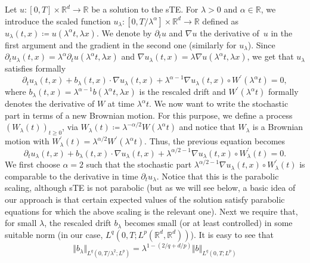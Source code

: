 \documentclass[a4paper,10pt]{article}
\newcommand\1{\mathbbm{1}}
\numberwithin{equation}{section}
\begin{document}
Let $u \colon[ 0,T] \times\mathbb{R}^{d}\rightarrow\mathbb{R}$ be a solution to the sTE. For $\lambda>0$  and $\alpha \in \mathbb{R}$, we introduce the scaled function $u_{\lambda} \colon [ 0,T/\lambda^{\alpha}] \times\mathbb{R}^{d}\rightarrow\mathbb{R}$ defined as $u_{\lambda}(t,x) \coloneqq u(\lambda^{\alpha }t,\lambda x)$. We denote by $\partial_t u$ and $\nabla u$ the derivative of~$u$ in the first argument and the gradient in the second one (similarly for $u_{\lambda}$). Since $\partial_t u_{\lambda}(t,x) =\lambda^{\alpha} \partial_t u(\lambda^{\alpha }t,\lambda x)$ and $\nabla u_{\lambda}(t,x)=\lambda\nabla u(\lambda^{\alpha}t,\lambda x)$, we get that $u_{\lambda}$ satisfies formally 
\begin{equation*}
\partial_t u_{\lambda}(t,x)+b_{\lambda}(t,x)\cdot\nabla
u_{\lambda}(t,x)+\lambda^{\alpha-1}\nabla u_{\lambda}(t,x)\circ W^{\prime}(\lambda^{\alpha}t)=0 ,
\end{equation*}
where $b_{\lambda}(t,x)=\lambda^{\alpha-1}b(\lambda^{\alpha}t,\lambda x)$ is the rescaled drift and $W^{\prime}(\lambda^{\alpha}t)$ formally denotes the derivative of $W$ at time $\lambda^{\alpha}t$. We now want to write the stochastic part in terms of a new Brownian motion. For this purpose, we define a process $(W_{\lambda
}(t))_{t\geq0}$, via $W_{\lambda}(t)\coloneqq \lambda^{-\alpha /2}W(\lambda^{\alpha}t)$ and notice that $W_{\lambda}$ is a Brownian motion with $W_{\lambda}^{\prime}(t)=\lambda^{\alpha/2}W^{\prime}(\lambda^{\alpha}t)$. Thus, the previous equation becomes
\begin{equation*}
\partial_t u_{\lambda}(t,x)+b_{\lambda}(t,x)\cdot\nabla
u_{\lambda}(t,x)+\lambda^{\alpha/2-1}\nabla u_{\lambda}(t,x)\circ W_{\lambda
}^{\prime}(t)=0 .
\end{equation*}
We first choose $\alpha=2$ such that the stochastic part $\lambda^{\alpha /2-1}\nabla u_{\lambda}(t,x)\circ W_{\lambda}^{\prime}(t)$ is comparable to the derivative in time $\partial_t u_{\lambda}$. Notice that this is the parabolic scaling, although sTE is not parabolic (but as we will see below, a basic idea of our approach is that certain expected values of the solution satisfy parabolic equations for which the above scaling is the relevant one). Next we require that, for small $\lambda$, the rescaled drift $b_{\lambda}$ becomes small (or at least controlled) in some suitable norm (in our case, $L^{q}( 0,T;L^{p}(\mathbb{R}^{d},\mathbb{R}^{d}) )$). It is easy to see that 
\begin{equation*}
\Vert b_{\lambda}\Vert_{L^{q}(0,T/\lambda^{2};L^{p})
}=\lambda^{1-(2/q+d/p)}\Vert b\Vert_{L^{q}(0,T;L^{p}) }
\end{equation*}
\end{document}
